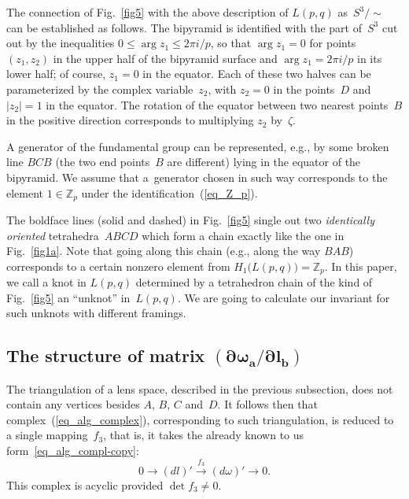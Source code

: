 \documentclass[pdftex]{sigma}
\begin{document}
The connection of Fig.~\ref{fig5} with the above description of $L(p,q)$ as~$S^3 / \sim $ can be established as follows. The bipyramid is identif\/ied with the part of~$S^3$ cut out by the inequalities $0\le \arg z_1 \le 2\pi i/p$, so that $\arg z_1=0$ for points $(z_1,z_2)$ in the upper half of the bipyramid surface and $\arg z_1 = 2\pi i/p$ in its lower half; of course, $z_1=0$ in the equator. Each of these two halves can be parameterized by the complex variable~$z_2$, with $z_2=0$ in the points~$D$ and $|z_2|=1$ in the equator. The rotation of the equator between two nearest points~$B$ in the positive direction corresponds to multiplying $z_2$ by~$\zeta$.

A generator of the fundamental group can be represented, e.g., by some broken line $BCB$ (the two end points~$B$ are dif\/ferent) lying in
the equator of the bipyramid. We assume that a~generator chosen in such way corresponds to the element $1\in \mathbb Z_p$ under the identif\/ication~(\ref{eq_Z_p}).

The boldface lines (solid and dashed) in Fig.~\ref{fig5} single out two \emph{identically oriented} tetrahedra~$ABCD$ which form a chain exactly
like the one in Fig.~\ref{fig1a}. Note that going along this chain (e.g., along the way $BAB$) corresponds to a certain nonzero element from $H_1 \bigl( L(p,q)\bigr) = \mathbb Z_p$. In this paper, we call a knot in $L(p,q)$ determined by a tetrahedron chain of the kind of Fig.~\ref{fig5} an ``unknot'' in~$L(p,q)$. We are going to calculate our invariant for such unknots with dif\/ferent framings.


\subsection[The structure of matrix $(\partial \omega_a/ \partial l_b)$]{The structure of matrix $\boldsymbol{(\partial \omega_a/ \partial l_b)}$}
\label{subsec_lens_structure}

The triangulation of a lens space, described in the previous subsection, does not contain any vertices besides $A$, $B$, $C$ and~$D$. It follows then that complex~(\ref{eq_alg_complex}), corresponding to such triangulation, is reduced to a single mapping~$f_3$, that is, it takes the already known to us form~\eqref{eq_alg_compl-copy}:
\begin{equation}
0\xrightarrow{} (dl)' \xrightarrow{f_3} (d\omega)' \xrightarrow{} 0.
\label{eq_alg_compl}
\end{equation}
This complex is acyclic provided $\det f_3 \ne 0$.
\end{document}
